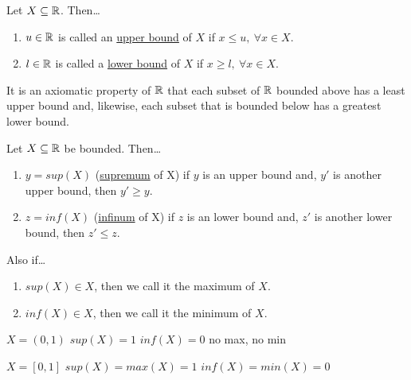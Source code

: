 
\begin{defn}
Let $X\subseteq \mathbb{R}$. Then\dots
\begin{enumerate}
	\item $u\in \mathbb{R}$ is called an \ul{upper bound} of $X$ if $x\leq u,\ \forall x\in X$.
	\item $l\in \mathbb{R}$ is called a \ul{lower bound} of $X$ if $x\geq l,\ \forall x\in X$.
\end{enumerate}
\end{defn}

It is an axiomatic property of $\mathbb{R}$ that each subset of $\mathbb{R}$ bounded above has a least upper bound and, likewise, each subset that is bounded below has a greatest lower bound.

\begin{defn}
	Let $X\subseteq \mathbb{R}$ be bounded. Then\dots
	\begin{enumerate}
	\item $y = sup(X)$ (\ul{supremum} of X) if $y$ is an upper bound and, $y'$ is another upper bound, then $y' \geq y$.
	\item $z = inf(X)$ (\ul{infinum} of X) if $z$ is an lower bound and, $z'$ is another lower bound, then $z' \leq z$.
\end{enumerate}
Also if\dots
\begin{enumerate}
\item $sup(X)\in X$, then we call it the maximum of $X$.
\item $inf(X)\in X$, then we call it the minimum of $X$.
\end{enumerate}
\end{defn}

\example

$X = (0,1)$ \qquad
$sup(X) = 1$ \qquad
$inf(X) = 0$ \qquad
no max, no min

$X = [0,1]$ \qquad
$sup(X) = max(X) = 1$ \qquad
$inf(X) = min(X) = 0$

